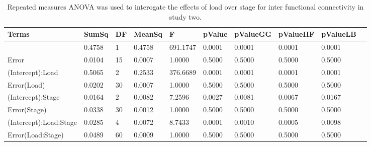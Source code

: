 \begin{table}
\centering
\begin{tabular}[0.2em]{@{}llllllllll@{}}\toprule
Terms & SumSq & DF & MeanSq & F & pValue & pValueGG & pValueHF & pValueLB\\\toprule[0.2em]
(Intercept) & 0.4758 & 1 & 0.4758 & 691.1747 & 0.0001 & 0.0001 & 0.0001 & 0.0001 \\\midrule
Error & 0.0104 & 15 & 0.0007 & 1.0000 & 0.5000 & 0.5000 & 0.5000 & 0.5000 \\\midrule
(Intercept):Load & 0.5065 & 2 & 0.2533 & 376.6689 & 0.0001 & 0.0001 & 0.0001 & 0.0001 \\\midrule
Error(Load) & 0.0202 & 30 & 0.0007 & 1.0000 & 0.5000 & 0.5000 & 0.5000 & 0.5000 \\\midrule
(Intercept):Stage & 0.0164 & 2 & 0.0082 & 7.2596 & 0.0027 & 0.0081 & 0.0067 & 0.0167 \\\midrule
Error(Stage) & 0.0338 & 30 & 0.0012 & 1.0000 & 0.5000 & 0.5000 & 0.5000 & 0.5000 \\\midrule
(Intercept):Load:Stage & 0.0285 & 4 & 0.0072 & 8.7433 & 0.0001 & 0.0010 & 0.0005 & 0.0098 \\\midrule
Error(Load:Stage) & 0.0489 & 60 & 0.0009 & 1.0000 & 0.5000 & 0.5000 & 0.5000 & 0.5000 \\\bottomrule[0.2em]
\end{tabular}
\caption{Repeated measures ANOVA was used to interogate the effects of load over stage for inter functional connectivity in study two.\label{tabel:tbl_RMAEFC2}}
\end{table}
